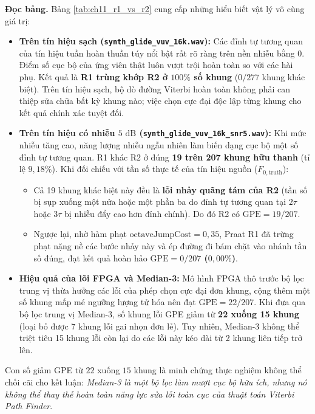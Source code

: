\textbf{Đọc bảng.} Bảng \ref{tab:ch11_r1_vs_r2} cung cấp những hiểu biết vật lý vô cùng giá trị:
\begin{itemize}
    \item \textbf{Trên tín hiệu sạch (\texttt{synth\_glide\_vuv\_16k.wav}):}
    Các đỉnh tự tương quan của tín hiệu tuần hoàn thuần túy nổi bật rất rõ ràng trên nền nhiễu bằng 0. Điểm số cục bộ của ứng viên thật luôn vượt trội hoàn toàn so với các hài phụ. Kết quả là \textbf{R1 trùng khớp R2 ở $100\%$ số khung} ($0 / 277$ khung khác biệt). Trên tín hiệu sạch, bộ dò đường Viterbi hoàn toàn không phải can thiệp sửa chữa bất kỳ khung nào; việc chọn cực đại độc lập từng khung cho kết quả chính xác tuyệt đối.
    \item \textbf{Trên tín hiệu có nhiễu $5\text{ dB}$ (\texttt{synth\_glide\_vuv\_16k\_snr5.wav}):}
    Khi mức nhiễu tăng cao, năng lượng nhiễu ngẫu nhiên làm biến dạng cục bộ một số đỉnh tự tương quan. R1 khác R2 ở đúng \textbf{19 trên 207 khung hữu thanh} (tỉ lệ $9{,}18\%$). Khi đối chiếu với tần số thực tế của tín hiệu nguồn ($F_{0,\text{truth}}$):
    \begin{itemize}
        \item Cả 19 khung khác biệt này đều là \textbf{lỗi nhảy quãng tám của R2} (tần số bị sụp xuống một nửa hoặc một phần ba do đỉnh tự tương quan tại $2\tau$ hoặc $3\tau$ bị nhiễu đẩy cao hơn đỉnh chính). Do đó R2 có $\text{GPE} = 19 / 207$.
        \item Ngược lại, nhờ hàm phạt $\text{octaveJumpCost} = 0{,}35$, Praat R1 đã trừng phạt nặng nề các bước nhảy này và ép đường đi bám chặt vào nhánh tần số đúng, đạt kết quả hoàn hảo \textbf{$\text{GPE} = 0 / 207$ ($0{,}00\%$)}.
    \end{itemize}
    \item \textbf{Hiệu quả của lõi FPGA và Median-3:}
    Mô hình FPGA thô trước bộ lọc trung vị thừa hưởng các lỗi của phép chọn cực đại đơn khung, cộng thêm một số khung mấp mé ngưỡng lượng tử hóa nên đạt $\text{GPE} = 22 / 207$.
    Khi đưa qua bộ lọc trung vị Median-3, số khung lỗi GPE giảm từ \textbf{22 xuống 15 khung} (loại bỏ được 7 khung lỗi gai nhọn đơn lẻ). Tuy nhiên, Median-3 không thể triệt tiêu 15 khung lỗi còn lại do các lỗi này kéo dài từ 2 khung liên tiếp trở lên.
\end{itemize}

Con số giảm GPE từ $22$ xuống $15$ khung là minh chứng thực nghiệm không thể chối cãi cho kết luận: \emph{Median-3 là một bộ lọc làm mượt cục bộ hữu ích, nhưng nó không thể thay thế hoàn toàn năng lực sửa lỗi toàn cục của thuật toán Viterbi Path Finder}.

